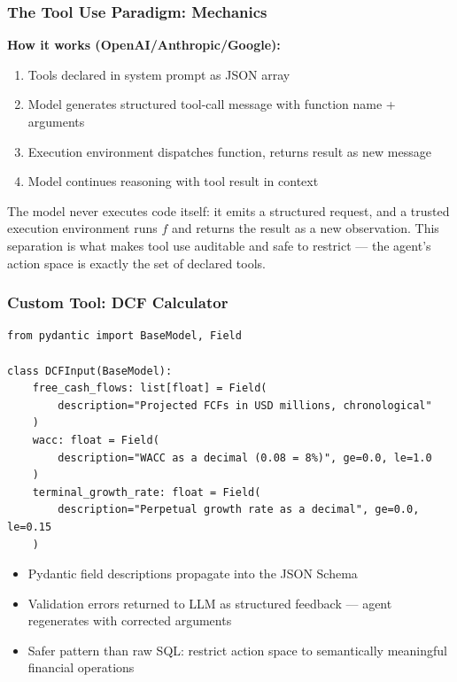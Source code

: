 \documentclass[9pt,t]{beamer}
\begin{document}
\begin{frame}
\frametitle{The Tool Use Paradigm: Mechanics}

\begin{underhood}
\textbf{How it works (OpenAI/Anthropic/Google):}
\begin{enumerate}
  \item Tools declared in system prompt as JSON array
  \item Model generates structured tool-call message with function name + arguments
  \item Execution environment dispatches function, returns result as new message
  \item Model continues reasoning with tool result in context
\end{enumerate}
\end{underhood}

\medskip
The model never executes code itself: it emits a structured request, and a
trusted execution environment runs $f$ and returns the result as a new
observation. This separation is what makes tool use auditable and safe to
restrict --- the agent's action space is exactly the set of declared tools.
\end{frame}

\begin{frame}[fragile]
\frametitle{Custom Tool: DCF Calculator}

\begin{lstlisting}
from pydantic import BaseModel, Field

class DCFInput(BaseModel):
    free_cash_flows: list[float] = Field(
        description="Projected FCFs in USD millions, chronological"
    )
    wacc: float = Field(
        description="WACC as a decimal (0.08 = 8%)", ge=0.0, le=1.0
    )
    terminal_growth_rate: float = Field(
        description="Perpetual growth rate as a decimal", ge=0.0, le=0.15
    )
\end{lstlisting}

\medskip
\begin{itemize}
  \item Pydantic field descriptions propagate into the JSON Schema
  \item Validation errors returned to LLM as structured feedback ---
        agent regenerates with corrected arguments
  \item Safer pattern than raw SQL: restrict action space to
        semantically meaningful financial operations
\end{itemize}
\end{frame}
\end{document}
